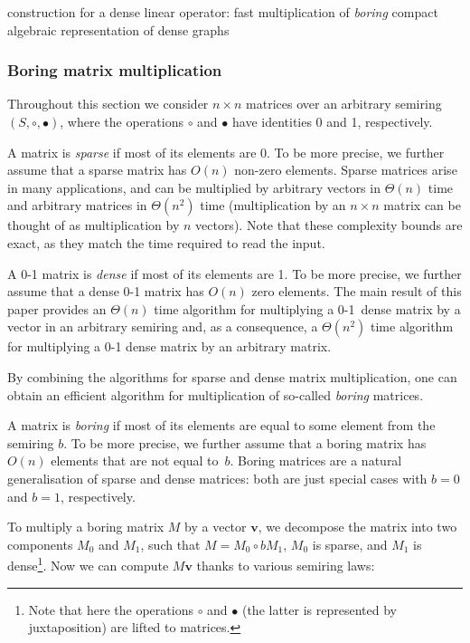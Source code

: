 \documentclass[11pt,letterpaper]{article}
\begin{document}

construction for a dense linear operator: fast multiplication of \emph{boring}
compact algebraic representation of dense graphs

\subsubsection{Boring matrix multiplication}\label{sec-boring-matrices}

Throughout this section we consider $n \times n$ matrices over an arbitrary
semiring $(S, \circ, \bullet)$, where the operations $\circ$ and $\bullet$ have
identities 0 and 1, respectively.

A matrix is \emph{sparse} if most of its elements are 0. To be more precise, we
further assume that a sparse matrix has $O(n)$ non-zero elements. Sparse
matrices arise in many applications, and can be multiplied by arbitrary vectors
in $\Theta(n)$ time and arbitrary matrices in $\Theta(n^2)$ time (multiplication
by an $n\times n$ matrix can be thought of as multiplication by $n$ vectors).
Note that these complexity bounds are exact, as they match the time required to
read the input.

A 0-1 matrix is \emph{dense} if most of its elements are 1. To be more precise,
we further assume that a dense 0-1 matrix has $O(n)$ zero elements. The main
result of this paper provides an $\Theta(n)$ time algorithm for multiplying a
0-1~dense matrix by a vector in an arbitrary semiring and, as a consequence, a
$\Theta(n^2)$ time algorithm for multiplying a 0-1 dense matrix by an arbitrary
matrix.

By combining the algorithms for sparse and dense matrix multiplication, one can
obtain an efficient algorithm for multiplication of so-called \emph{boring}
matrices.

A matrix is \emph{boring} if most of its elements are equal to some element from
the semiring $b$. To be more precise, we further assume that a boring matrix has
$O(n)$ elements that are not equal to~$b$. Boring matrices are a natural
generalisation of sparse and dense matrices: both are just special cases with
$b=0$ and $b=1$, respectively.

To multiply a boring matrix $M$ by a vector $\mathbf{v}$, we decompose the
matrix into two components $M_0$ and $M_1$, such that $M = M_0 \circ b M_1$,
$M_0$ is sparse, and $M_1$ is dense\footnote{Note that here the operations
$\circ$ and $\bullet$ (the latter is represented by juxtaposition) are lifted to
matrices.}. Now we can compute $M \mathbf{v}$ thanks to various semiring laws:
\end{document}
